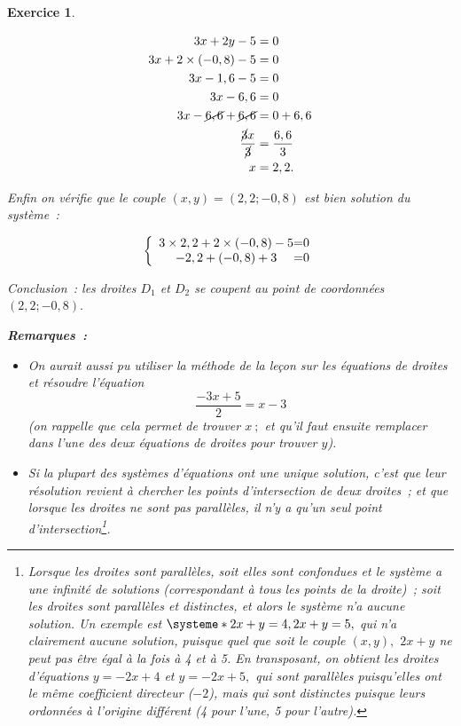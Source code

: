 \documentclass[10pt]{article}
\newtheorem{exo}{Exercice}
\begin{document}
\begin{exo}
\begin{enumerate}
\begin{align*}
3x+2y-5&=0\\
3x+2\times (-0,8)-5&=0\\
3x-1,6-5&=0\\
3x-6,6&=0\\
3x-\cancel{6,6}+\cancel{6,6}&=0+6,6\\
\frac{\cancel{3}x}{\cancel{3}}&=\frac{6,6}{3}\\
x&=2,2.\end{align*}
\end{enumerate}


\medskip

Enfin on vérifie que le couple $(x,y)=(2,2;-0,8)$ est bien solution du système~:


\[
\left \{
\begin{array}{c @{=} c}
    3\times 2,2+2\times(-0,8) -5& 0 \\
    -2,2+(-0,8)+3 & 0 \\
\end{array}
\right.
\]

\medskip

Conclusion~: les droites $D_1$ et $D_2$ se coupent au point de coordonnées $(2,2;-0,8).$

\medskip

\textbf{Remarques~:}

\begin{itemize}
\item[\textbullet] On aurait aussi pu utiliser la méthode de la leçon sur les équations de droites et résoudre l'équation
\[\frac{-3x+5}{2}=x-3\] (on rappelle que cela permet de trouver $x~;$ et qu'il faut ensuite remplacer dans l'une des deux équations de droites pour trouver $y$).
\item[\textbullet] Si la plupart des systèmes d'équations ont une unique solution, c'est que leur résolution revient à chercher les points d'intersection de deux droites~; et que lorsque les droites ne sont pas parallèles, il n'y a qu'un seul point d'intersection\footnote{Lorsque les droites sont parallèles, soit elles sont confondues et le système a une infinité de solutions (correspondant à tous les points de la droite)~; soit les droites sont parallèles et distinctes, et alors le système n'a aucune solution. Un exemple est $\systeme*{2x+y=4,2x+y=5},$ qui n'a clairement aucune solution, puisque quel que soit le couple $(x,y),$ $2x+y$ ne peut pas être égal à la fois à 4 et à 5. En transposant, on obtient les droites d'équations $y=-2x+4$ et $y=-2x+5,$ qui sont parallèles puisqu'elles ont le même coefficient directeur ($-2$), mais qui sont distinctes puisque leurs ordonnées à l'origine différent (4 pour l'une, 5 pour l'autre).}.
\end{itemize}

\end{exo}
\end{document}
